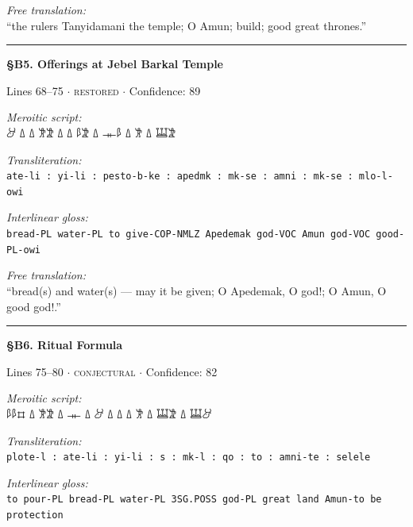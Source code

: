\documentclass[11pt,a4paper]{article}
\begin{document}
{{{{{{{{{{{{\vspace{4pt}
\noindent\textit{Free translation:}\\[2pt]
``the rulers Tanyidamani the temple; O Amun; build; good great thrones.''

\vspace{2pt}
\noindent\rule{\textwidth}{0.3pt}


\vspace{6pt}
\noindent\textbf{\S B5. Offerings at Jebel Barkal Temple}
\hfill {\small Lines 68–75 $\cdot$ \textsc{restored} $\cdot$ Confidence: 89%

\vspace{3pt}
\noindent\textit{Meroitic script:}\\[2pt]
{\meroitic 𐦀𐦓 𐦗 𐦂 𐦗 𐦁𐦔 𐦗 𐦀𐦁 𐦗  𐦗 𐦀𐦂 𐦗  𐦗 𐦃}

\vspace{4pt}
\noindent\textit{Transliteration:}\\[2pt]
\texttt{ate-li : yi-li : pesto-b-ke : apedmk : mk-se : amni : mk-se : mlo-l-owi}

\vspace{4pt}
\noindent\textit{Interlinear gloss:}\\[2pt]
{\small\texttt{bread-PL  water-PL  to give-COP-NMLZ  Apedemak  god-VOC  Amun  god-VOC  good-PL-owi}}

\vspace{4pt}
\noindent\textit{Free translation:}\\[2pt]
``bread(s) and water(s) — may it be given; O Apedemak, O god!; O Amun, O good god!.''

\vspace{2pt}
\noindent\rule{\textwidth}{0.3pt}


\vspace{6pt}
\noindent\textbf{\S B6. Ritual Formula}
\hfill {\small Lines 75–80 $\cdot$ \textsc{conjectural} $\cdot$ Confidence: 82%

\vspace{3pt}
\noindent\textit{Meroitic script:}\\[2pt]
{\meroitic 𐦃𐦓 𐦗 𐦀𐦓 𐦗 𐦂 𐦗  𐦗  𐦗 𐦃 𐦗 𐦔 𐦗 𐦀𐦂 𐦗 𐦕𐦁𐦁}

\vspace{4pt}
\noindent\textit{Transliteration:}\\[2pt]
\texttt{plote-l : ate-li : yi-li : s : mk-l : qo : to : amni-te : selele}

\vspace{4pt}
\noindent\textit{Interlinear gloss:}\\[2pt]
{\small\texttt{to pour-PL  bread-PL  water-PL  3SG.POSS  god-PL  great  land  Amun-to be  protection}}

}}}}}}}}}}}}}}
\end{document}
